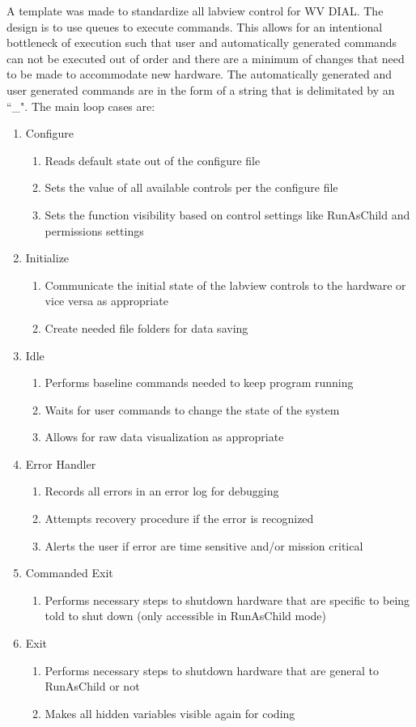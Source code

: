 A template was made to standardize all labview control for WV DIAL. The design is to use queues to execute commands. This allows for an intentional bottleneck of execution such that user and automatically generated commands can not be executed out of order and there are a minimum of changes that need to be made to accommodate new hardware. The automatically generated and user generated commands are in the form of a string that is delimitated by an ``\_". The main loop cases are:
\begin{enumerate}
\item{Configure}
\begin{enumerate}
\item{Reads default state out of the configure file}
\item{Sets the value of all available controls per the configure file}
\item{Sets the function visibility based on control settings like RunAsChild and permissions settings}
\end{enumerate}
\item{Initialize}
\begin{enumerate}
\item{Communicate the initial state of the labview controls to the hardware or vice versa as appropriate}
\item{Create needed file folders for data saving}
\end{enumerate}
\item{Idle}
\begin{enumerate}
\item{Performs baseline commands needed to keep program running}
\item{Waits for user commands to change the state of the system}
\item{Allows for raw data visualization as appropriate}
\end{enumerate}
\item{Error Handler}
\begin{enumerate}
\item{Records all errors in an error log for debugging}
\item{Attempts recovery procedure if the error is recognized}
\item{Alerts the user if error are time sensitive and/or mission critical}
\end{enumerate}
\item{Commanded Exit}
\begin{enumerate}
\item{Performs necessary steps to shutdown hardware that are specific to being told to shut down (only accessible in RunAsChild mode)}
\end{enumerate}
\item{Exit}
\begin{enumerate}
\item{Performs necessary steps to shutdown hardware that are general to RunAsChild or not}
\item{Makes all hidden variables visible again for coding}
\end{enumerate}
\end{enumerate}


